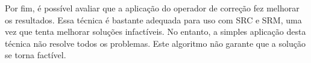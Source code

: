 \documentclass[conference]{IEEEtran}
\begin{document}
Por fim, é possível avaliar que a aplicação do operador de correção fez melhorar os resultados. Essa técnica é bastante adequada para uso com SRC e SRM, uma vez que tenta melhorar soluções infactíveis. No entanto, a simples aplicação desta técnica não resolve todos os problemas. Este algoritmo não garante que a solução se torna factível.

%
\IEEEpeerreviewmaketitle


%
%

\end{document}
